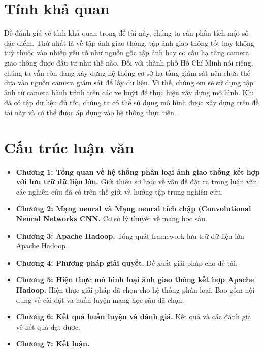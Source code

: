 \section*{Tính khả quan}
	Đề đánh giá về tính khả quan trong đề tài này, chúng ta cần phân tích một số đặc điểm. Thứ nhất là về tập ảnh giao thông, tập ảnh giao thông tốt hay không tuỳ thuộc vào nhiều yếu tố như nguồn gốc tập ảnh hay cơ cấu hạ tầng camera giao thông được đầu tư như thế nào. Đối với thành phố Hồ Chí Minh nói riêng, chúng ta vẫn còn đang xây dựng hệ thống cơ sở hạ tầng giám sát nên chưa thể dựa vào nguồn camera giám sát để lấy dữ liệu. Vì thế, chúng em sẽ sử dụng tập ảnh từ camera hành trình trên các xe buýt để thực hiện xây dựng mô hình. Khi đã có tập dữ liệu đủ tốt, chúng ta có thể sử dụng mô hình được xây dựng trên đề tài này và có thể được áp dụng vào hệ thống thực tiễn.

\section*{Cấu trúc luận văn}
\begin{itemize}
	\item \textbf{Chương 1: Tổng quan về hệ thống phân loại ảnh giao thống kết hợp với lưu trữ dữ liệu lớn.} Giới thiệu sơ lược về vấn đề đặt ra trong luận văn, các nghiên cứu đã có trên thế giới và hướng tập trung nghiên cứu.
	\item \textbf{Chương 2: Mạng neural và Mạng neural tích chập (Convolutional Neural Networks CNN.} Cơ sở lý thuyết về mạng học sâu.
	\item \textbf{Chương 3: Apache Hadoop.} Tổng quát framework lưu trữ dữ liệu lớn Apache Hadoop.
	\item \textbf{Chương 4: Phương pháp giải quyết.} Đề xuất giải pháp cho đề tài.
	\item \textbf{Chương 5: Hiện thực mô hình loại ảnh giao thông kết hợp Apache Hadoop. }Hiện thực giải pháp đã chọn cho hệ thống phân loại. Bao gồm nội dung về cài đặt va huấn luyện mạng học sâu đã chọn.
	\item \textbf{Chương 6: Kết quả huấn luyện và đánh giá.} Kết quả và các đánh giá vê kết quả đạt được.
	\item \textbf{Chương 7: Kết luận.}
\end{itemize}